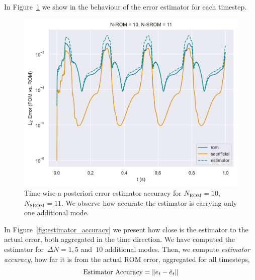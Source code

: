 \documentclass[../../thesis.tex]{subfiles}
\begin{document}
In Figure~\ref{fig:estimator_accuracy_timewise} we show in the behaviour of the error estimator 
for each timestep.
\begin{figure}[h]
    \centering
    \includegraphics[width=1\columnwidth]{research_project/piston/figures/rb_certification/error_estimation_rom_10_srom_11.png}
    \caption{Time-wise a posteriori error estimator accuracy for $N_{\text{ROM}} = 10$, $N_{\text{SROM}} = 11$.
    We observe how accurate the estimator is carrying only one additional mode.}
    \label{fig:estimator_accuracy_timewise}
\end{figure}
In Figure~\ref{fig:estimator_accuracy} we present how close is the estimator to the actual error,
both aggregated in the time direction.
We have computed the estimator for~\mbox{$\Delta N = 1, 5$} and~$10$ additional modes.
Then, we compute \textit{estimator accuracy}, how far it is from the actual ROM error,
aggregated for all timesteps, 
\begin{equation}
    \text{Estimator Accuracy} = \norm{e_t - \tilde{e}_t} 
\end{equation}
\end{document}
